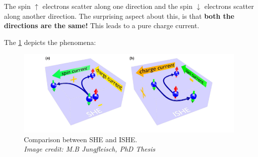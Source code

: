 The spin $\uparrow$ electrons scatter along one direction and the spin $\downarrow$ electrons scatter along another direction. The surprising aspect about this, is that \textbf{both the directions are the same!}
This leads to a pure charge current.

The \cref{she-vs-ishe} depicts the phenomena:

\begin{figure}[h!]
    \includegraphics[width=\columnwidth]{ishe.png}
    \caption{Comparison between SHE and ISHE.\\ \vspace{0.2cm}\textit{Image credit: M.B Jungfleisch, PhD Thesis}}
    \label{she-vs-ishe}
\end{figure}

